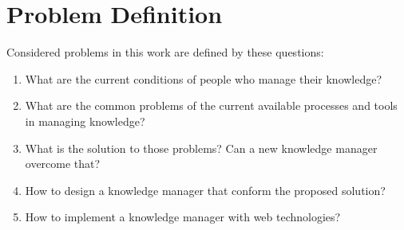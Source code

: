 \section{Problem Definition}
\label{sec:problem-definition}

Considered problems in this work are defined by these questions:

\begin{enumerate}
\item What are the current conditions of people who manage their knowledge?
\item What are the common problems of the current available processes and tools in managing knowledge?
\item What is the solution to those problems? Can a new knowledge manager overcome that?
\item How to design a knowledge manager that conform the proposed solution?
\item How to implement a knowledge manager with web technologies?
\end{enumerate}
